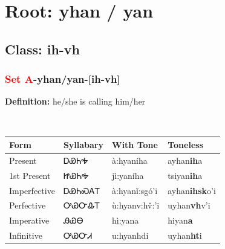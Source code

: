 \needspace{4in}
\section*{Root: yhan / yan}
\nopagebreak
{}
\needspace{3in}
\subsection*{Class: ih-vh}
\nopagebreak
\needspace{2in}
\subsubsection*{\textcolor{Red}{Set A}{-}\textbf{yhan/yan}{-}[ih-vh]}
\nopagebreak
\textbf{Definition: } he/she is calling him/her
\\[0.5em]
\begin{tabularx}{\textwidth}{l X X X}%
\toprule%
\textbf{Form}&\textbf{Syllabary}&\textbf{With Tone}&\textbf{Toneless}\\%
\midrule%
Present&ᎠᏯᏂᎭ&à:hyaníha&ayhan\textbf{ih}a\\%
1st Present&ᏥᏯᏂᎭ&jì:yaníha&tsiyan\textbf{ih}a\\%
Imperfective&ᎠᏯᏂᏍᎪᎢ&à:hyanǐ:sgó’i&ayhan\textbf{ihsk}o'i\\%
Perfective&ᎤᏯᏅᎲᎢ&ù:hyanv:hv̌:’i&uyhan\textbf{vh}v'i\\%
Imperative&ᎯᏯᎾ&hì:yana&hiyan\textbf{a}\\%
Infinitive&ᎤᏯᏅᏗ&u:hyanhdi&uyhan\textbf{ht}i\\%
\bottomrule%
\end{tabularx}
\\[1em]